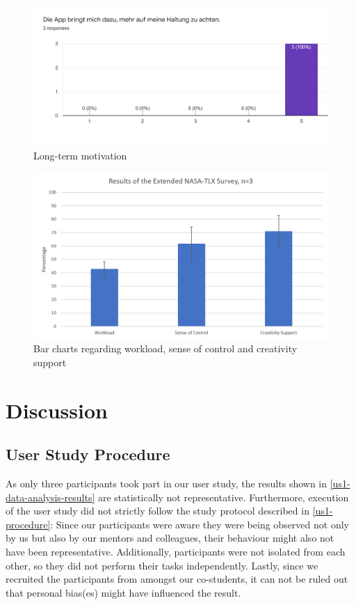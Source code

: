 \begin{figure}[hbp]
\centering
\includegraphics[width=\linewidth]{media/us-gs-longterm-motivation-results.png}    
\caption{Long-term motivation}
\label{fig:us-gs-longterm}
\end{figure}

\begin{figure}[hbp]
\centering
\includegraphics[width=\linewidth]{media/us-ext-nasa-tlx-results.png}    
\caption{Bar charts regarding workload, sense of control and creativity support}
    \label{fig:ext-nasa-results}
\end{figure}

\section{Discussion} %
\label{discussion-future-work}


\subsection{User Study Procedure}
As only three participants took part in our user study, the results shown in \ref{us1-data-analysis-results} are statistically not representative. Furthermore, execution of the user study did not strictly follow the study protocol described in \ref{us1-procedure}: Since our participants were aware they were being observed not only by us but also by our mentors and colleagues, their behaviour might also not have been representative. Additionally, participants were not isolated from each other, so they did not perform their tasks independently. Lastly, since we recruited the participants from amongst our co-students, it can not be ruled out that personal bias(es) might have influenced the result.


